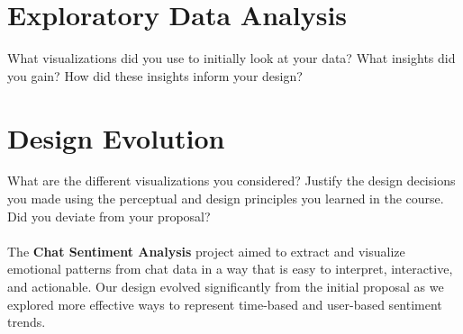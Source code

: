 \documentclass{article}\usepackage{graphicx}
\begin{document}
\section*{Exploratory Data Analysis}
What visualizations did you use to initially look at your data? What insights did you gain? How did these insights inform your design?

\section*{Design Evolution}

What are the different visualizations you considered? Justify the design decisions you made using the perceptual and design principles you learned in the course. Did you deviate from your proposal?
\\
\\The \textbf{Chat Sentiment Analysis} project aimed to extract and visualize emotional patterns from chat data in a way that is easy to interpret, interactive, and actionable. Our design evolved significantly from the initial proposal as we explored more effective ways to represent time-based and user-based sentiment trends.
\end{document}
